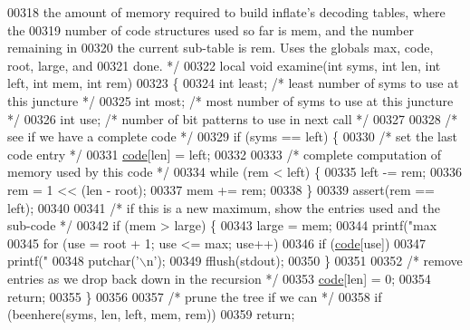 \begin{DoxyCode}
00318 \textcolor{comment}{   the amount of memory required to build inflate's decoding tables, where the}
00319 \textcolor{comment}{   number of code structures used so far is mem, and the number remaining in}
00320 \textcolor{comment}{   the current sub-table is rem.  Uses the globals max, code, root, large, and}
00321 \textcolor{comment}{   done. */}
00322 local \textcolor{keywordtype}{void} examine(\textcolor{keywordtype}{int} syms, \textcolor{keywordtype}{int} len, \textcolor{keywordtype}{int} left, \textcolor{keywordtype}{int} mem, \textcolor{keywordtype}{int} rem)
00323 \{
00324     \textcolor{keywordtype}{int} least;          \textcolor{comment}{/* least number of syms to use at this juncture */}
00325     \textcolor{keywordtype}{int} most;           \textcolor{comment}{/* most number of syms to use at this juncture */}
00326     \textcolor{keywordtype}{int} use;            \textcolor{comment}{/* number of bit patterns to use in next call */}
00327 
00328     \textcolor{comment}{/* see if we have a complete code */}
00329     \textcolor{keywordflow}{if} (syms == left) \{
00330         \textcolor{comment}{/* set the last code entry */}
00331         \hyperlink{structcode}{code}[len] = left;
00332 
00333         \textcolor{comment}{/* complete computation of memory used by this code */}
00334         \textcolor{keywordflow}{while} (rem < left) \{
00335             left -= rem;
00336             rem = 1 << (len - root);
00337             mem += rem;
00338         \}
00339         assert(rem == left);
00340 
00341         \textcolor{comment}{/* if this is a new maximum, show the entries used and the sub-code */}
00342         \textcolor{keywordflow}{if} (mem > large) \{
00343             large = mem;
00344             printf(\textcolor{stringliteral}{"max %
00345             \textcolor{keywordflow}{for} (use = root + 1; use <= max; use++)
00346                 \textcolor{keywordflow}{if} (\hyperlink{structcode}{code}[use])
00347                     printf(\textcolor{stringliteral}{"%
00348             putchar(\textcolor{charliteral}{'\(\backslash\)n'});
00349             fflush(stdout);
00350         \}
00351 
00352         \textcolor{comment}{/* remove entries as we drop back down in the recursion */}
00353         \hyperlink{structcode}{code}[len] = 0;
00354         \textcolor{keywordflow}{return};
00355     \}
00356 
00357     \textcolor{comment}{/* prune the tree if we can */}
00358     \textcolor{keywordflow}{if} (beenhere(syms, len, left, mem, rem))
00359         \textcolor{keywordflow}{return};
}}
\end{DoxyCode}
